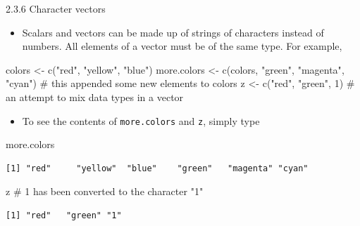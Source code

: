 \documentclass[
  9pt,
  a4paper,
  ignorenonframetext,
  notheorems]{beamer}
\newenvironment{Shaded}{\begin{snugshade}}{\end{snugshade}}
\newcommand{\CommentTok}[1]{\textcolor[rgb]{0.37,0.37,0.37}{#1}}
\newcommand{\DecValTok}[1]{\textcolor[rgb]{0.68,0.00,0.00}{#1}}
\newcommand{\FunctionTok}[1]{\textcolor[rgb]{0.28,0.35,0.67}{#1}}
\newcommand{\NormalTok}[1]{\textcolor[rgb]{0.00,0.23,0.31}{#1}}
\newcommand{\OtherTok}[1]{\textcolor[rgb]{0.00,0.23,0.31}{#1}}
\newcommand{\StringTok}[1]{\textcolor[rgb]{0.13,0.47,0.30}{#1}}
\providecommand{\tightlist}{%
  \setlength{\itemsep}{0pt}\setlength{\parskip}{0pt}}\usepackage{longtable,booktabs,array}
\begin{document}
\begin{frame}[fragile]{2.3.6 Character vectors}
\protect\hypertarget{character-vectors}{}
\begin{itemize}
\tightlist
\item
  Scalars and vectors can be made up of strings of characters instead of
  numbers. All elements of a vector must be of the same type. For
  example,
\end{itemize}

\begin{Shaded}
\begin{Highlighting}[]
\NormalTok{colors }\OtherTok{\textless{}{-}} \FunctionTok{c}\NormalTok{(}\StringTok{"red"}\NormalTok{, }\StringTok{"yellow"}\NormalTok{, }\StringTok{"blue"}\NormalTok{)}
\NormalTok{more.colors }\OtherTok{\textless{}{-}} \FunctionTok{c}\NormalTok{(colors, }\StringTok{"green"}\NormalTok{, }\StringTok{"magenta"}\NormalTok{, }\StringTok{"cyan"}\NormalTok{) }\CommentTok{\# this appended some new elements to colors}
\NormalTok{z }\OtherTok{\textless{}{-}} \FunctionTok{c}\NormalTok{(}\StringTok{"red"}\NormalTok{, }\StringTok{"green"}\NormalTok{, }\DecValTok{1}\NormalTok{) }\CommentTok{\# an attempt to mix data types in a vector}
\end{Highlighting}
\end{Shaded}

\begin{itemize}
\tightlist
\item
  To see the contents of \texttt{more.colors} and \texttt{z}, simply
  type
\end{itemize}

\begin{Shaded}
\begin{Highlighting}[]
\NormalTok{more.colors}
\end{Highlighting}
\end{Shaded}

\begin{verbatim}
[1] "red"     "yellow"  "blue"    "green"   "magenta" "cyan"   
\end{verbatim}

\begin{Shaded}
\begin{Highlighting}[]
\NormalTok{z }\CommentTok{\# 1 has been converted to the character "1"}
\end{Highlighting}
\end{Shaded}

\begin{verbatim}
[1] "red"   "green" "1"    
\end{verbatim}


\end{frame}
\end{document}
